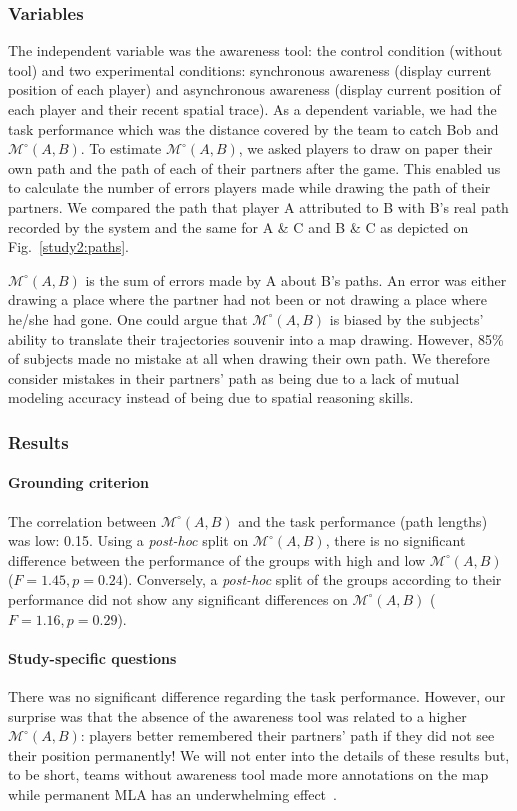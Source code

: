 \documentclass[twocolumn]{article}
\newcommand{\gModel}[2]{{$\mathcal{M}^{\circ}(#1, #2)$}}
\begin{document}
\subsubsection*{Variables}

The independent variable was the awareness tool: the control condition (without
tool) and two experimental conditions: synchronous awareness (display current
position of each player) and asynchronous awareness (display current position of
each player and their recent spatial trace).  As a dependent variable, we had
the task performance which was the distance covered by the team to catch Bob and
\gModel{A}{B}. To estimate \gModel{A}{B}, we asked players to draw on paper
their own path and the path of each of their partners after the game. This
enabled us to calculate the number of errors players made while drawing the path
of their partners. We compared the path that player A attributed to B with B's
real path recorded by the system and the same for A \& C and B \& C as depicted
on Fig.~\ref{study2:paths}. 

\gModel{A}{B} is the sum of errors made by A about B's paths. An error was
either drawing a place where the partner had not been or not drawing a place
where he/she had gone. One could argue that \gModel{A}{B} is biased by the
subjects' ability to translate their trajectories souvenir into a map drawing.
However, 85\% of subjects made no mistake at all when drawing their own path. We
therefore consider mistakes in their partners' path as being due to a lack of
mutual modeling accuracy instead of being due to spatial reasoning skills.

\subsubsection*{Results}

\paragraph{Grounding criterion} The correlation between \gModel{A}{B} and the
task performance (path lengths) was low: 0.15. Using a \emph{post-hoc} split on
\gModel{A}{B}, there is no significant difference between the performance of the
groups with high and low \gModel{A}{B}  ($F = 1.45, p = 0.24$). Conversely, a
\emph{post-hoc} split of the groups according to their performance did not show
any significant differences on \gModel{A}{B} ($F = 1.16, p = 0.29$).

\paragraph{Study-specific questions} There was no significant difference
regarding the task performance. However, our surprise was that the absence of
the awareness tool was related to a higher \gModel{A}{B}: players better
remembered their partners' path if they did not see their position permanently!
We will not enter into the details of these results but, to be short, teams
without awareness tool made more annotations on the map while permanent MLA has
an underwhelming effect~\cite{nova2005location}.
\end{document}
